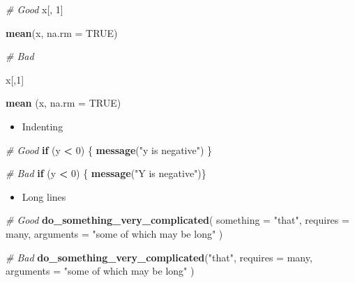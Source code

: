\documentclass[
]{book}
\newenvironment{Shaded}{\begin{snugshade}}{\end{snugshade}}
\newcommand{\CommentTok}[1]{\textcolor[rgb]{0.56,0.35,0.01}{\textit{#1}}}
\newcommand{\ControlFlowTok}[1]{\textcolor[rgb]{0.13,0.29,0.53}{\textbf{#1}}}
\newcommand{\DataTypeTok}[1]{\textcolor[rgb]{0.13,0.29,0.53}{#1}}
\newcommand{\DecValTok}[1]{\textcolor[rgb]{0.00,0.00,0.81}{#1}}
\newcommand{\KeywordTok}[1]{\textcolor[rgb]{0.13,0.29,0.53}{\textbf{#1}}}
\newcommand{\NormalTok}[1]{#1}
\newcommand{\OperatorTok}[1]{\textcolor[rgb]{0.81,0.36,0.00}{\textbf{#1}}}
\newcommand{\OtherTok}[1]{\textcolor[rgb]{0.56,0.35,0.01}{#1}}
\newcommand{\StringTok}[1]{\textcolor[rgb]{0.31,0.60,0.02}{#1}}
\providecommand{\tightlist}{%
  \setlength{\itemsep}{0pt}\setlength{\parskip}{0pt}}
\begin{document}
\begin{Shaded}
\begin{Highlighting}[]
\CommentTok{\# Good}
\NormalTok{x[, }\DecValTok{1}\NormalTok{] }

\KeywordTok{mean}\NormalTok{(x, }\DataTypeTok{na.rm =} \OtherTok{TRUE}\NormalTok{) }

\CommentTok{\# Bad}

\NormalTok{x[,}\DecValTok{1}\NormalTok{]}

\KeywordTok{mean}\NormalTok{ (x, }\DataTypeTok{na.rm =} \OtherTok{TRUE}\NormalTok{)}
\end{Highlighting}
\end{Shaded}

\begin{itemize}
\tightlist
\item
  Indenting
\end{itemize}

\begin{Shaded}
\begin{Highlighting}[]
\CommentTok{\# Good}
\ControlFlowTok{if}\NormalTok{ (y }\OperatorTok{<}\StringTok{ }\DecValTok{0}\NormalTok{) \{}
  \KeywordTok{message}\NormalTok{(}\StringTok{"y is negative"}\NormalTok{)}
\NormalTok{\}}

\CommentTok{\# Bad}
\ControlFlowTok{if}\NormalTok{ (y }\OperatorTok{<}\StringTok{ }\DecValTok{0}\NormalTok{) \{}
\KeywordTok{message}\NormalTok{(}\StringTok{"Y is negative"}\NormalTok{)\}}
\end{Highlighting}
\end{Shaded}

\begin{itemize}
\tightlist
\item
  Long lines
\end{itemize}

\begin{Shaded}
\begin{Highlighting}[]
\CommentTok{\# Good}
\KeywordTok{do\_something\_very\_complicated}\NormalTok{(}
  \DataTypeTok{something =} \StringTok{"that"}\NormalTok{,}
  \DataTypeTok{requires =}\NormalTok{ many,}
  \DataTypeTok{arguments =} \StringTok{"some of which may be long"}
\NormalTok{)}

\CommentTok{\# Bad}
\KeywordTok{do\_something\_very\_complicated}\NormalTok{(}\StringTok{"that"}\NormalTok{, }\DataTypeTok{requires =}\NormalTok{ many, }\DataTypeTok{arguments =}
                              \StringTok{"some of which may be long"}
\NormalTok{                              )}
\end{Highlighting}
\end{Shaded}
\end{document}
